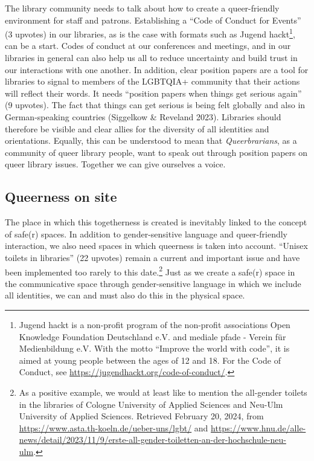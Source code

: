 \documentclass[a4paper,
fontsize=11pt,
oneside,
numbers=noperiodatend,
parskip=half-,
bibliography=totoc,
final
]{scrartcl}
\begin{document}
The library community needs to talk about how to create a queer-friendly
environment for staff and patrons. Establishing a \enquote{Code of Conduct for
Events} (3 upvotes) in our libraries, as is the case with formats such
as Jugend hackt\footnote{Jugend hackt is a non-profit program of the
  non-profit associations Open Knowledge Foundation Deutschland e.V. and
  mediale pfade - Verein für Medienbildung e.V. With the motto \enquote{Improve
  the world with code}, it is aimed at young people between the ages of
  12 and 18. For the Code of Conduct, see
  \url{https://jugendhackt.org/code-of-conduct/}.}, can be a start.
Codes of conduct at our conferences and meetings, and in our libraries
in general can also help us all to reduce uncertainty and build trust in
our interactions with one another. In addition, clear position papers
are a tool for libraries to signal to members of the LGBTQIA+ community
that their actions will reflect their words. It needs \enquote{position papers
when things get serious again} (9 upvotes). The fact that things can get
serious is being felt globally and also in German-speaking countries
(Siggelkow \& Reveland 2023). Libraries should therefore be visible and
clear allies for the diversity of all identities and orientations.
Equally, this can be understood to mean that \emph{Queerbrarians}, as a
community of queer library people, want to speak out through position
papers on queer library issues. Together we can give ourselves a voice.

\hypertarget{queerness-on-site}{%
\subsection{Queerness on site}\label{queerness-on-site}}

The place in which this togetherness is created is inevitably linked to
the concept of safe(r) spaces. In addition to gender-sensitive language
and queer-friendly interaction, we also need spaces in which queerness
is taken into account. \enquote{Unisex toilets in libraries} (22 upvotes) remain
a current and important issue and have been implemented too rarely to
this date.\footnote{As a positive example, we would at least like to
  mention the all-gender toilets in the libraries of Cologne University
  of Applied Sciences and Neu-Ulm University of Applied Sciences.
  Retrieved February 20, 2024, from
  \url{https://www.asta.th-koeln.de/ueber-uns/lgbt/} and
  \url{https://www.hnu.de/alle-news/detail/2023/11/9/erste-all-gender-toiletten-an-der-hochschule-neu-ulm}.}
Just as we create a safe(r) space in the communicative space through
gender-sensitive language in which we include all identities, we can and
must also do this in the physical space.
\end{document}
